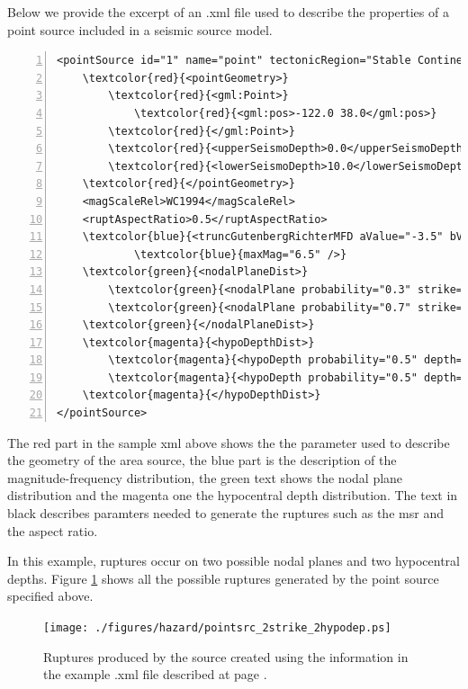 Below we provide the excerpt of an .xml file used to describe the 
properties of a point source included in a seismic source model.
\label{page:xml_point}
\begin{Verbatim}[frame=single, commandchars=\\\{\}, fontsize=\footnotesize,
    numbers=left, numbersep=2pt]
<pointSource id="1" name="point" tectonicRegion="Stable Continental Crust">
    \textcolor{red}{<pointGeometry>}
        \textcolor{red}{<gml:Point>}
            \textcolor{red}{<gml:pos>-122.0 38.0</gml:pos>}
        \textcolor{red}{</gml:Point>}
        \textcolor{red}{<upperSeismoDepth>0.0</upperSeismoDepth>}
        \textcolor{red}{<lowerSeismoDepth>10.0</lowerSeismoDepth>}
    \textcolor{red}{</pointGeometry>}
    <magScaleRel>WC1994</magScaleRel>
    <ruptAspectRatio>0.5</ruptAspectRatio>
    \textcolor{blue}{<truncGutenbergRichterMFD aValue="-3.5" bValue="1.0" minMag="5.0" }
			\textcolor{blue}{maxMag="6.5" />}
    \textcolor{green}{<nodalPlaneDist>}
        \textcolor{green}{<nodalPlane probability="0.3" strike="0.0" dip="90.0" rake="0.0" />}
        \textcolor{green}{<nodalPlane probability="0.7" strike="90.0" dip="45.0" rake="90.0" />}
    \textcolor{green}{</nodalPlaneDist>}
    \textcolor{magenta}{<hypoDepthDist>}
        \textcolor{magenta}{<hypoDepth probability="0.5" depth="4.0" />}
        \textcolor{magenta}{<hypoDepth probability="0.5" depth="8.0" />}
    \textcolor{magenta}{</hypoDepthDist>}
</pointSource>
\end{Verbatim}
The red part in the sample xml above shows the the parameter used to 
describe the geometry of the area source, the blue part is the description
of the magnitude-frequency distribution, the green text shows the nodal 
plane distribution and the magenta one the hypocentral depth distribution.
The text in black describes paramters needed to generate the ruptures 
such as the \gls{msr} and the aspect ratio.

In this example, ruptures occur on two possible nodal planes and two 
hypocentral depths. Figure \ref{fig:point_source_ruptures} shows all 
the possible ruptures generated by the point source specified above.

\begin{figure}[!ht]
\centering
\texttt{[image: ./figures/hazard/pointsrc\_2strike\_2hypodep.ps]}
\caption{Ruptures produced by the source created using the information 
    in the example .xml file described at page \pageref{page:xml_point}.}
\label{fig:point_source_ruptures}
\end{figure}
%
